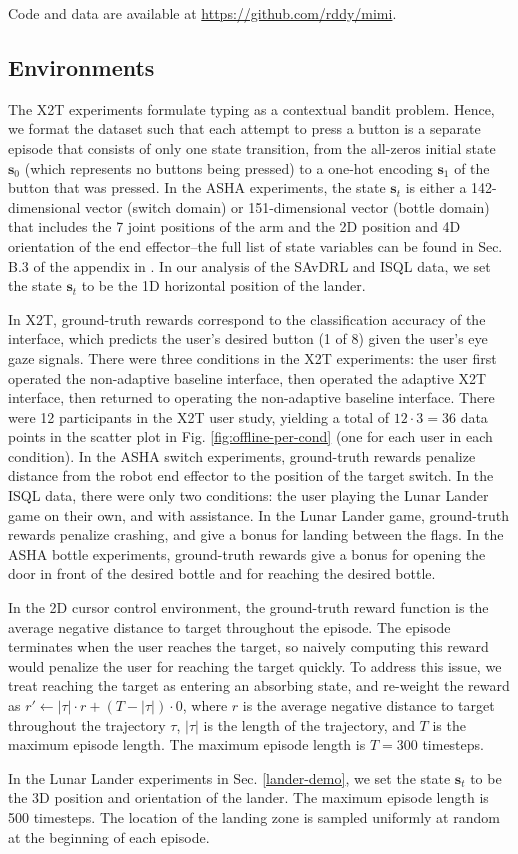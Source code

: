 \documentclass{article}
\newcommand{\bs}{\mathbf{s}}
\begin{document}
Code and data are available at \url{https://github.com/rddy/mimi}.

\subsection{Environments} \label{env-details}

The X2T experiments formulate typing as a contextual bandit problem.
Hence, we format the dataset such that each attempt to press a button is a separate episode that consists of only one state transition, from the all-zeros initial state $\bs_0$ (which represents no buttons being pressed) to a one-hot encoding $\bs_1$ of the button that was pressed.
In the ASHA experiments, the state $\bs_t$ is either a 142-dimensional vector (switch domain) or 151-dimensional vector (bottle domain) that includes the 7 joint positions of the arm and the 2D position and 4D orientation of the end effector--the full list of state variables can be found in Sec. B.3 of the appendix in \cite{asha2022}.
In our analysis of the SAvDRL and ISQL data, we set the state $\bs_t$ to be the 1D horizontal position of the lander.

In X2T, ground-truth rewards correspond to the classification accuracy of the interface, which predicts the user's desired button (1 of 8) given the user's eye gaze signals. 
There were three conditions in the X2T experiments: the user first operated the non-adaptive baseline interface, then operated the adaptive X2T interface, then returned to operating the non-adaptive baseline interface. 
There were 12 participants in the X2T user study, yielding a total of $12 \cdot 3 = 36$ data points in the scatter plot in Fig. \ref{fig:offline-per-cond} (one for each user in each condition). 
In the ASHA switch experiments, ground-truth rewards penalize distance from the robot end effector to the position of the target switch. 
In the ISQL data, there were only two conditions: the user playing the Lunar Lander game on their own, and with assistance. 
In the Lunar Lander game, ground-truth rewards penalize crashing, and give a bonus for landing between the flags. 
In the ASHA bottle experiments, ground-truth rewards give a bonus for opening the door in front of the desired bottle and for reaching the desired bottle.

In the 2D cursor control environment, the ground-truth reward function is the average negative distance to target throughout the episode. 
The episode terminates when the user reaches the target, so naively computing this reward would penalize the user for reaching the target quickly.
To address this issue, we treat reaching the target as entering an absorbing state, and re-weight the reward as $r' \leftarrow |\tau| \cdot r + (T - |\tau|) \cdot 0$, where $r$ is the average negative distance to target throughout the trajectory $\tau$, $|\tau|$ is the length of the trajectory, and $T$ is the maximum episode length.
The maximum episode length is $T = 300$ timesteps.

In the Lunar Lander experiments in Sec. \ref{lander-demo}, we set the state $\bs_t$ to be the 3D position and orientation of the lander.
The maximum episode length is 500 timesteps.
The location of the landing zone is sampled uniformly at random at the beginning of each episode.
\end{document}

